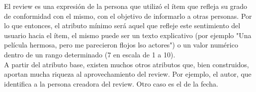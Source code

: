 El review es una expresión de la persona que utilizó el ítem que refleja su grado de conformidad con el mismo, con el objetivo de informarlo a otras personas. Por lo que entonces, el atributo mínimo será aquel que refleje este sentimiento del usuario hacia el ítem, el mismo puede ser un texto explicativo (por ejemplo "Una película hermosa, pero me parecieron flojos lso actores") o un valor numérico dentro de un rango determinado (7 en escala de 1 a 10).\\
A partir del atributo base, existen muchos otros atributos que, bien construidos, aportan mucha riqueza al aprovechamiento del review. Por ejemplo, el autor, que identifica a la persona creadora del review. Otro caso es el de la fecha.\\